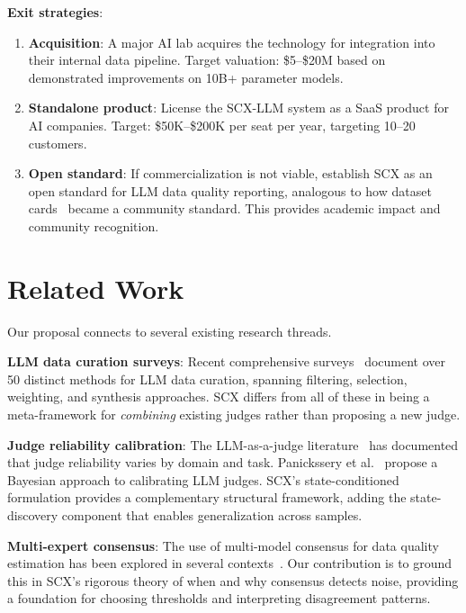 \documentclass[11pt,twocolumn]{article}
\begin{document}
\textbf{Exit strategies}:
\begin{enumerate}
    \item \textbf{Acquisition}: A major AI lab acquires the technology for integration into their internal data pipeline. Target valuation: \$5--\$20M based on demonstrated improvements on 10B+ parameter models.
    \item \textbf{Standalone product}: License the SCX-LLM system as a SaaS product for AI companies. Target: \$50K--\$200K per seat per year, targeting 10--20 customers.
    \item \textbf{Open standard}: If commercialization is not viable, establish SCX as an open standard for LLM data quality reporting, analogous to how dataset cards~\cite{gebru2021datasheets} became a community standard. This provides academic impact and community recognition.
\end{enumerate}

\section{Related Work}

Our proposal connects to several existing research threads.

\textbf{LLM data curation surveys}: Recent comprehensive surveys~\cite{long2024data,albalak2024survey,liang2024data} document over 50 distinct methods for LLM data curation, spanning filtering, selection, weighting, and synthesis approaches. SCX differs from all of these in being a meta-framework for \textit{combining} existing judges rather than proposing a new judge.

\textbf{Judge reliability calibration}: The LLM-as-a-judge literature~\cite{zheng2024judging,wang2023judging,panickssery2024llm} has documented that judge reliability varies by domain and task. Panickssery et al.~\cite{panickssery2024llm} propose a Bayesian approach to calibrating LLM judges. SCX's state-conditioned formulation provides a complementary structural framework, adding the state-discovery component that enables generalization across samples.

\textbf{Multi-expert consensus}: The use of multi-model consensus for data quality estimation has been explored in several contexts~\cite{jungo2020calibration,malinin2018predictive,lakshminarayanan2017deep}. Our contribution is to ground this in SCX's rigorous theory of when and why consensus detects noise, providing a foundation for choosing thresholds and interpreting disagreement patterns.
\end{document}
